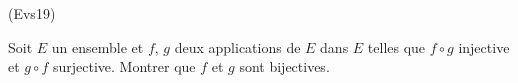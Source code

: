 \begin{tiny}(Evs19)\end{tiny} Soit $E$ un ensemble et $f$, $g$ deux applications de $E$ dans $E$ telles que $f\circ g$ injective et $g \circ f$ surjective. Montrer que $f$ et $g$ sont bijectives.